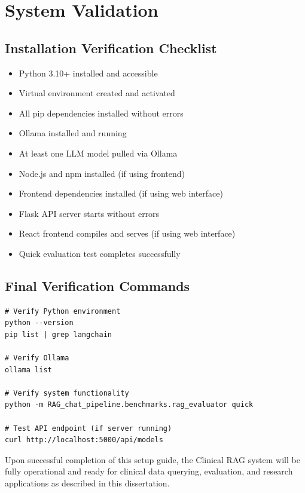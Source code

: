 \section{System Validation}

\subsection{Installation Verification Checklist}

\begin{itemize}
    \item[$\square$] Python 3.10+ installed and accessible
    \item[$\square$] Virtual environment created and activated
    \item[$\square$] All pip dependencies installed without errors
    \item[$\square$] Ollama installed and running
    \item[$\square$] At least one LLM model pulled via Ollama
    \item[$\square$] Node.js and npm installed (if using frontend)
    \item[$\square$] Frontend dependencies installed (if using web interface)
    \item[$\square$] Flask API server starts without errors
    \item[$\square$] React frontend compiles and serves (if using web interface)
    \item[$\square$] Quick evaluation test completes successfully
\end{itemize}

\subsection{Final Verification Commands}

\begin{verbatim}
# Verify Python environment
python --version
pip list | grep langchain

# Verify Ollama
ollama list

# Verify system functionality
python -m RAG_chat_pipeline.benchmarks.rag_evaluator quick

# Test API endpoint (if server running)
curl http://localhost:5000/api/models
\end{verbatim}

Upon successful completion of this setup guide, the Clinical RAG system will be fully operational and ready for clinical data querying, evaluation, and research applications as described in this dissertation.
